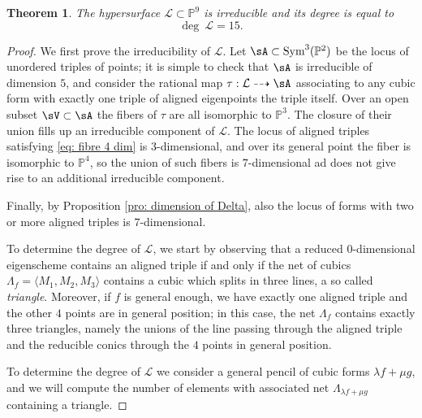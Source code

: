 \documentclass{amsart}
\theoremstyle{plain}
\newtheorem{theorem}{Theorem}[section]
\theoremstyle{definition}
\newcommand{\p}{\mathbb{P}}
\newcommand{\sL}{\mathcal{L}}
\begin{document}
\begin{theorem} The hypersurface $\sL \subset \p^9$ is irreducible and its degree is equal to
\[
  \deg \ \mathcal L =  15.
\]
\end{theorem}

\begin{proof}
We first prove the irreducibility of $\sL$.
Let $\sA \subset {\rm Sym}^3(\p^2 )$ be the locus of unordered triples of points; it is simple to check that $\sA$ is irreducible of dimension $5$, and consider the rational map $\tau:\sL \dasharrow \sA$
associating to any cubic form with exactly one triple of aligned eigenpoints the triple itself. Over an open subset $\sV \subset \sA$ the fibers of $\tau$ are all isomorphic to $\p^3$. The closure of their union fills up an irreducible component of $\sL$. The locus of aligned triples satisfying \eqref{eq: fibre 4 dim} is $3$-dimensional, and over its general point the fiber is isomorphic to $\p^4$, so the union of such fibers is $7$-dimensional ad does not give rise to an additional irreducible component.

Finally, by Proposition \ref{pro: dimension of Delta}, also the locus of forms with two or more aligned triples is $7$-dimensional.


To determine the degree of $\sL$, we start by observing that a reduced $0$-dimensional eigenscheme contains an aligned triple if and only if the net of cubics $\Lambda_f = \langle M_1, M_2, M_3 \rangle$ contains a cubic which splits in three lines, a so called {\it triangle}. Moreover, if $f$ is general enough, we have exactly one aligned triple and the other $4$ points are in general position; in this case, the net $\Lambda_f$ contains exactly three triangles, namely the unions of the line passing through the aligned triple and the reducible conics through the $4$ points in general position.

To determine the degree of $\mathcal L$ we consider a general pencil of cubic forms $\lambda f + \mu g$, and we will compute the number of elements with associated net $\Lambda_{\lambda f + \mu g}$ containing a triangle.


\end{proof}
\end{document}
